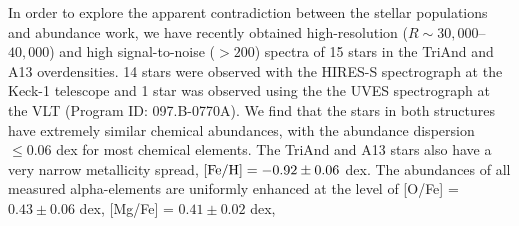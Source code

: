 \documentclass[galaxies,article,submit,moreauthors,pdftex,10pt,a4paper]{mdpi}
\begin{document}
In order to explore the apparent contradiction between the stellar populations
and abundance work, we have recently obtained high-resolution ($R \sim
30,000$--$40,000$) and high signal-to-noise ($>200$) spectra of 15 stars in the
TriAnd and A13 overdensities.
14 stars were observed with the HIRES-S spectrograph at the Keck-1 telescope
\cite{vogt1994} and 1 star was observed using the the UVES spectrograph at the
VLT (Program ID: 097.B-0770A).
We find that the stars in both structures have extremely similar chemical
abundances, with the abundance dispersion $\leq 0.06$ dex for most chemical
elements.
The TriAnd and A13 stars also have a very narrow metallicity spread, ${\rm
[Fe/H]} = -0.92 \pm 0.06$ dex.
The abundances of all measured alpha-elements are uniformly enhanced at the
level of [O/Fe] = $0.43 \pm 0.06$ dex, [Mg/Fe] = $0.41 \pm 0.02$ dex,
\end{document}
